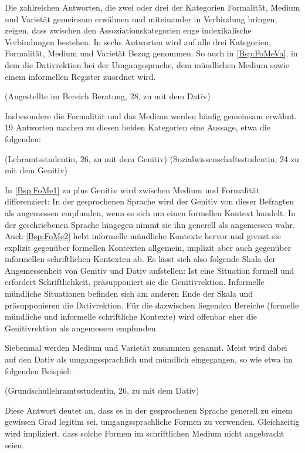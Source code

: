 Die zahlreichen Antworten, die zwei oder drei der Kategorien \glqq Formalität\grqq, \glqq Medium\grqq{} und \glqq Varietät\grqq{} gemeinsam erwähnen und miteinander in Verbindung bringen, zeigen, dass zwischen den Assoziationskategorien enge indexikalische Verbindungen bestehen. 
In sechs Antworten wird auf alle drei Kategorien, \glqq Formalität\grqq, \glqq Medium\grqq{} und \glqq Varietät\grqq{} Bezug genommen. 
So auch in \autoref{Bsp:FoMeVa}, in dem die Dativrektion bei \waehrend{} der Umgangssprache, dem mündlichen Medium sowie einem informellen Register zuordnet wird. 
\begin{exe}
\ex {} (Angestellte im Bereich Beratung, 28, zu \waehrend{} mit dem Dativ) \label{Bsp:FoMeVa}
\end{exe}
Insbesondere die Formalität und das Medium werden häufig gemeinsam erwähnt. 
19 Antworten machen zu diesen beiden Kategorien eine Aussage, etwa die folgenden:  
\begin{exe}
\ex {} (Lehramtsstudentin, 26, zu \wegen{} mit dem Genitiv) \label{Bsp:FoMe1}
\ex {} (Sozialwissenschaftsstudentin, 24 zu \dank{} mit dem Genitiv) \label{Bsp:FoMe2}
\end{exe}
In \autoref{Bsp:FoMe1} zu \wegen{} plus Genitiv wird zwischen Medium und Formalität differenziert: 
In der gesprochenen Sprache wird der Genitiv von dieser Befragten als angemessen empfunden, wenn es sich um einen formellen Kontext handelt. 
In der geschriebenen Sprache hingegen nimmt sie ihn generell als angemessen wahr. 
Auch \autoref{Bsp:FoMe2} hebt informelle mündliche Kontexte hervor und grenzt sie explizit gegenüber formellen Kontexten allgemein, implizit aber auch gegenüber informellen schriftlichen Kontexten ab. 
Es lässt sich also folgende Skala der Angemessenheit von Genitiv und Dativ aufstellen:
Ist eine Situation formell und erfordert Schriftlichkeit, präsupponiert sie die Genitivrektion. 
Informelle mündliche Situationen befinden sich am anderen Ende der Skala und präsupponieren die Dativrektion. 
Für die dazwischen liegenden Bereiche (formelle mündliche und informelle schriftliche Kontexte) wird offenbar eher die Genitivrektion als angemessen empfunden. 

Siebenmal werden Medium und Varietät zusammen genannt. 
Meist wird dabei auf den Dativ als umgangssprachlich und mündlich eingegangen, so wie etwa im folgenden Beispiel:  
\begin{exe}
\ex {} (Grundschullehramtsstudentin, 26, zu \wegen{} mit dem Dativ)
\end{exe}
Diese Antwort deutet an, dass es in der gesprochenen Sprache generell zu einem gewissen Grad legitim sei, umgangssprachliche Formen zu verwenden. 
Gleichzeitig wird impliziert, dass solche Formen im schriftlichen Medium nicht angebracht seien.  

